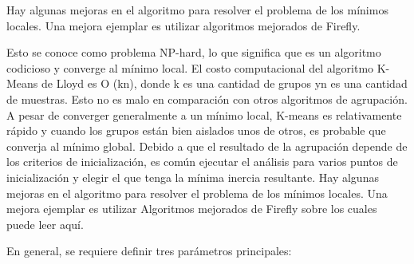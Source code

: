 \documentclass[12pt, fleqn]{report}                             %
\theoremstyle{break}                                            %
\begin{document}
        Hay algunas
        mejoras en el algoritmo para resolver el problema de los mínimos locales. Una mejora ejemplar es utilizar 
        algoritmos mejorados de Firefly.

        Esto se conoce como problema NP-hard, lo que significa que es un algoritmo codicioso y converge al mínimo local. El costo computacional del algoritmo K-Means de Lloyd es O (kn), donde k es una cantidad de grupos yn es una cantidad de muestras. Esto no es malo en comparación con otros algoritmos de agrupación. A pesar de converger generalmente a un mínimo local, K-means es relativamente rápido y cuando los grupos están bien aislados unos de otros, es probable que converja al mínimo global. Debido a que el resultado de la agrupación depende de los criterios de inicialización, es común ejecutar el análisis para varios puntos de inicialización y elegir el que tenga la mínima inercia resultante. Hay algunas mejoras en el algoritmo para resolver el problema de los mínimos locales. Una mejora ejemplar es utilizar Algoritmos mejorados de Firefly sobre los cuales puede leer aquí.

        En general, se requiere definir tres parámetros principales:
\end{document}
